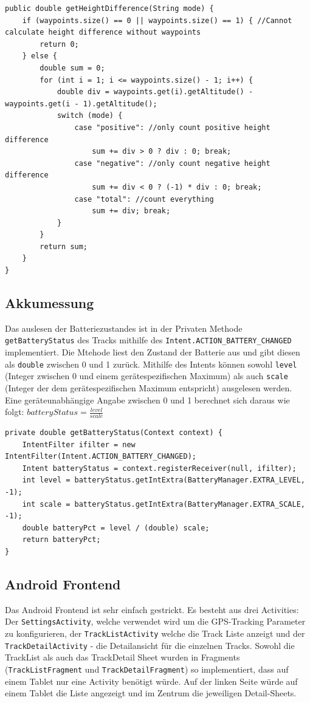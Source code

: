 \begin{lstlisting}[caption={Berechnung der Höhendifferenz}, label={lst:heightDifference}]
public double getHeightDifference(String mode) {
	if (waypoints.size() == 0 || waypoints.size() == 1) { //Cannot calculate height difference without waypoints
		return 0;
	} else {
		double sum = 0;
		for (int i = 1; i <= waypoints.size() - 1; i++) {
			double div = waypoints.get(i).getAltitude() - waypoints.get(i - 1).getAltitude();
			switch (mode) {
				case "positive": //only count positive height difference
					sum += div > 0 ? div : 0; break;
				case "negative": //only count negative height difference
					sum += div < 0 ? (-1) * div : 0; break;
				case "total": //count everything
					sum += div; break;
			}
		}
		return sum;
	}
}
\end{lstlisting}


\subsection{Akkumessung}
\label{subsec:battery}
Das auslesen der Batteriezustandes ist in der Privaten Methode \lstinline$getBatteryStatus$ des Tracks mithilfe des \lstinline$Intent.ACTION_BATTERY_CHANGED$ implementiert. Die Mtehode liest den Zustand der Batterie aus und gibt diesen als \lstinline$double$ zwischen 0 und 1 zurück. Mithilfe des Intents können sowohl \lstinline$level$ (Integer zwischen 0 und einem gerätespezifischen Maximum) als auch \lstinline$scale$ (Integer der dem gerätespezifischen Maximum entspricht) ausgelesen werden. Eine geräteunabhängige Angabe zwischen 0 und 1 berechnet sich daraus wie folgt: $batteryStatus=\frac{level}{scale}$ \cite{batterystatus}
\begin{lstlisting}[caption={Auslesen des Batterystatus}, label={lst:batterystatus}]
private double getBatteryStatus(Context context) {
	IntentFilter ifilter = new IntentFilter(Intent.ACTION_BATTERY_CHANGED);
	Intent batteryStatus = context.registerReceiver(null, ifilter);
	int level = batteryStatus.getIntExtra(BatteryManager.EXTRA_LEVEL, -1);
	int scale = batteryStatus.getIntExtra(BatteryManager.EXTRA_SCALE, -1);
	double batteryPct = level / (double) scale;
	return batteryPct;
}
\end{lstlisting}

\subsection{Android Frontend}
Das Android Frontend ist sehr einfach gestrickt. Es besteht aus drei Activities: Der \lstinline$SettingsActivity$, welche verwendet wird um die GPS-Tracking Parameter zu konfigurieren, der \lstinline$TrackListActivity$ welche die Track Liste anzeigt und der \lstinline$TrackDetailActivity$ - die Detailansicht für die einzelnen Tracks. Sowohl die TrackList als auch das TrackDetail Sheet wurden in Fragments (\lstinline$TrackListFragment$ und \lstinline$TrackDetailFragment$) so implementiert, dass auf einem Tablet nur eine Activity benötigt würde. Auf der linken Seite würde auf einem Tablet die Liste angezeigt und im Zentrum die jeweiligen Detail-Sheets.

